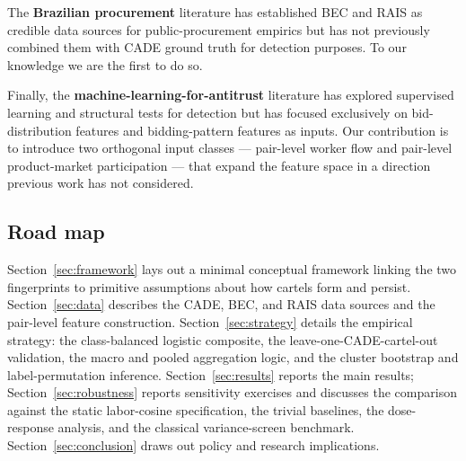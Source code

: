The \textbf{Brazilian procurement} literature \citep{ferrazfinan2008, ferrazfinan2011, barbosa2020revolving, szerman2023employee, colonelli2022corruption} has established BEC and RAIS as credible data sources for public-procurement empirics but has not previously combined them with CADE ground truth for detection purposes. To our knowledge we are the first to do so.

Finally, the \textbf{machine-learning-for-antitrust} literature \citep{huber2019detection, chassang2022robust, kawai2023bidrotation} has explored supervised learning and structural tests for detection but has focused exclusively on bid-distribution features and bidding-pattern features as inputs. Our contribution is to introduce two orthogonal input classes --- pair-level worker flow and pair-level product-market participation --- that expand the feature space in a direction previous work has not considered.

\subsection*{Road map}

Section~\ref{sec:framework} lays out a minimal conceptual framework linking the two fingerprints to primitive assumptions about how cartels form and persist. Section~\ref{sec:data} describes the CADE, BEC, and RAIS data sources and the pair-level feature construction. Section~\ref{sec:strategy} details the empirical strategy: the class-balanced logistic composite, the leave-one-CADE-cartel-out validation, the macro and pooled aggregation logic, and the cluster bootstrap and label-permutation inference. Section~\ref{sec:results} reports the main results; Section~\ref{sec:robustness} reports sensitivity exercises and discusses the comparison against the static labor-cosine specification, the trivial baselines, the dose-response analysis, and the classical variance-screen benchmark. Section~\ref{sec:conclusion} draws out policy and research implications.
